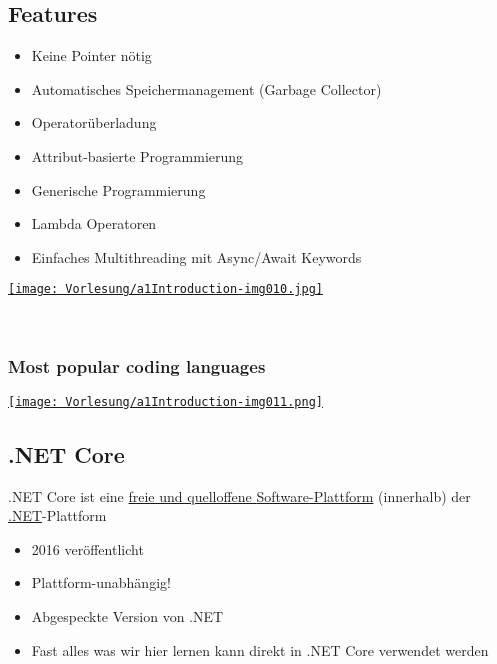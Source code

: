 \subsection{Features}
\begin{itemize}
\item Keine Pointer nötig
\item Automatisches Speichermanagement (Garbage Collector)
\item Operatorüberladung
\item Attribut-basierte Programmierung
\item Generische Programmierung
\item Lambda Operatoren
\item Einfaches Multithreading mit Async/Await Keywords
\end{itemize}

\begin{center}
\href{https://visualstudiomagazine.com/articles/salary-surveys/salary-survey.aspx}{ \texttt{[image: Vorlesung/a1Introduction-img010.jpg]}}
\end{center}


~

\subsubsection*{Most popular coding languages}

\begin{center}
\href{https://blogs.msdn.microsoft.com/zxue/2016/10/24/how-many-developers-use-c-vs-c-vs-other-programming-languages/}{\texttt{[image: Vorlesung/a1Introduction-img011.png]}}
\end{center}


\subsection{.NET Core}
.NET Core ist eine \href{https://de.wikipedia.org/wiki/Free/Libre_Open_Source_Software}{freie und quelloffene }\href{https://de.wikipedia.org/wiki/Plattform_(Computer)}{Software-Plattform} (innerhalb) der \href{https://de.wikipedia.org/wiki/.NET}{.NET}{}-Plattform
\begin{itemize}
\item 2016 veröffentlicht
\item Plattform-unabhängig!
\item Abgespeckte Version von .NET
\item Fast alles was wir hier lernen kann direkt in .NET Core verwendet werden
\end{itemize}

